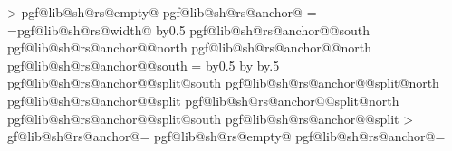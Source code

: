 {{			%
			\pgfmathloop%
				\ifnum\pgfmathcounter>\parts%
				\else%
					\pgf@lib@sh@getalpha\pgf@lib@sh@rs@number{\pgfmathcounter}%
					\expandafter\ifx\csname pgf@lib@sh@rs@empty@\pgf@lib@sh@rs@number\endcsname\pgfutil@empty%
					\else%
						\csname pgf@lib@sh@rs@anchor@\pgf@lib@sh@rs@number\endcsname%
						\pgf@xa=\pgf@x%
						\pgf@xb=\csname pgf@lib@sh@rs@width@\pgf@lib@sh@rs@number\endcsname\relax%
						\advance\pgf@xa by0.5\pgf@xb%
						\expandafter\pgfextract@process\csname pgf@lib@sh@rs@anchor@\pgf@lib@sh@rs@number @south\endcsname{%
							\southwest%
							\pgf@x=\pgf@xa%
						}%
						\expandafter\pgfextract@process\csname pgf@lib@sh@rs@anchor@\pgf@lib@sh@rs@number @north\endcsname{%
							\northeast%
							\pgf@x=\pgf@xa%
						}%
						\expandafter\addtosavedmacro\csname pgf@lib@sh@rs@anchor@\pgf@lib@sh@rs@number @north\endcsname%
						\expandafter\addtosavedmacro\csname pgf@lib@sh@rs@anchor@\pgf@lib@sh@rs@number @south\endcsname%
						\ifnum\pgfmathcounter=\parts%
						\else%
							\advance\pgf@xa by0.5\pgf@xb%
							\advance\pgf@xa by\innerxsep\relax%
							\advance\pgf@xa by.5\pgflinewidth%
							\expandafter\pgfextract@process\csname pgf@lib@sh@rs@anchor@\pgf@lib@sh@rs@number @split@south\endcsname{%
								\southwest%
								\pgf@x=\pgf@xa%
							}%
							\expandafter\pgfextract@process\csname pgf@lib@sh@rs@anchor@\pgf@lib@sh@rs@number @split@north\endcsname{%
								\northeast%
								\pgf@x=\pgf@xa%
							}%
							\expandafter\pgfextract@process\csname pgf@lib@sh@rs@anchor@\pgf@lib@sh@rs@number @split\endcsname{%
								\centerpoint%
								\pgf@x=\pgf@xa%
							}%
							\expandafter\addtosavedmacro\csname pgf@lib@sh@rs@anchor@\pgf@lib@sh@rs@number @split@north\endcsname%
							\expandafter\addtosavedmacro\csname pgf@lib@sh@rs@anchor@\pgf@lib@sh@rs@number @split@south\endcsname%
							\expandafter\addtosavedmacro\csname pgf@lib@sh@rs@anchor@\pgf@lib@sh@rs@number @split\endcsname%
						\fi%
					\fi%
			\repeatpgfmathloop%
		\else%
			\pgf@y=0pt\relax%
			\pgfmathloop%
				\ifnum\pgfmathcounter>\parts%
				\else%
					\pgf@lib@sh@getalpha\pgf@lib@sh@rs@number{\pgfmathcounter}%
					\expandafter\let\csname pgf@lib@sh@rs@anchor@\pgf@lib@sh@rs@number\endcsname=\pgfutil@empty%
					\expandafter\ifx\csname pgf@lib@sh@rs@empty@\pgf@lib@sh@rs@number\endcsname\pgfutil@empty%
						\ifpgfrectanglesplitignoreemptyparts%
							\expandafter\let\csname pgf@lib@sh@rs@anchor@\pgf@lib@sh@rs@number\endcsname=%
								\pgf@lib@sh@rs@lastanchor%
}}
